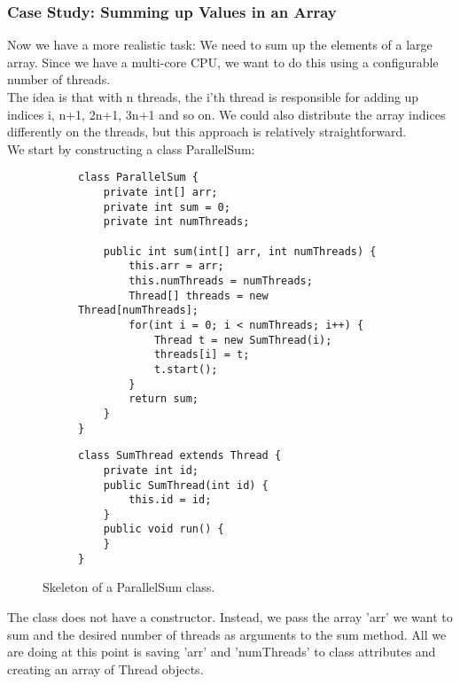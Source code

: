 \documentclass[main.tex]{subfiles}
\begin{document}
\subsubsection{Case Study: Summing up Values in an Array}
Now we have a more realistic task: We need to sum up the elements of a large array. Since we have a multi-core CPU, we want to do this using a configurable number of threads.\\[3mm]
The idea is that with n threads, the i'th thread is responsible for adding up indices i, n+1, 2n+1, 3n+1 and so on. We could also distribute the array indices differently on the threads, but this approach is relatively straightforward.\\
We start by constructing a class ParallelSum:
\begin{figure}[H]
    \begin{subfigure}[t]{.62\textwidth}
        \begin{verbatim}
class ParallelSum {
    private int[] arr;
    private int sum = 0;
    private int numThreads;

    public int sum(int[] arr, int numThreads) {
        this.arr = arr;
        this.numThreads = numThreads;
        Thread[] threads = new Thread[numThreads];
        for(int i = 0; i < numThreads; i++) {
            Thread t = new SumThread(i);
            threads[i] = t;
            t.start();
        }
        return sum;
    }
}
        \end{verbatim}
    \end{subfigure}%
    \begin{subfigure}[t]{.62\textwidth}
        \begin{verbatim}
class SumThread extends Thread {
    private int id;
    public SumThread(int id) {
        this.id = id;
    }
    public void run() {
    }
}
        \end{verbatim}
    \end{subfigure}
    \caption{Skeleton of a ParallelSum class.}
\end{figure}
The class does not have a constructor. Instead, we pass the array 'arr' we want to sum and the desired number of threads as arguments to the sum method. All we are doing at this point is saving 'arr' and 'numThreads' to class attributes and creating an array of Thread objects.\\
\end{document}
